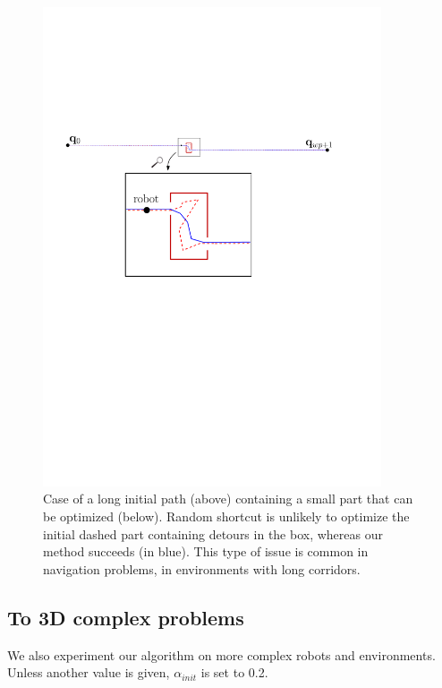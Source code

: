 \documentclass{tADR2e}
\begin{document}
\begin{figure}
	\centering
	\includegraphics[width=10cm]{local_box_optim.pdf}
	\caption{Case of a long initial path (above) containing a small part 
	that can 
	be optimized (below). Random shortcut is unlikely to optimize the initial 
	dashed part containing detours in the box, whereas our method 
	succeeds (in blue). This type of issue is common in navigation problems, in 
	environments with long corridors.}
	\label{local_box_optim}
\end{figure}



\subsection{To 3D complex problems}

We also experiment our algorithm on more complex robots and environments. Unless another value is given, $\alpha_{init}$ is set to 0.2.
\end{document}
